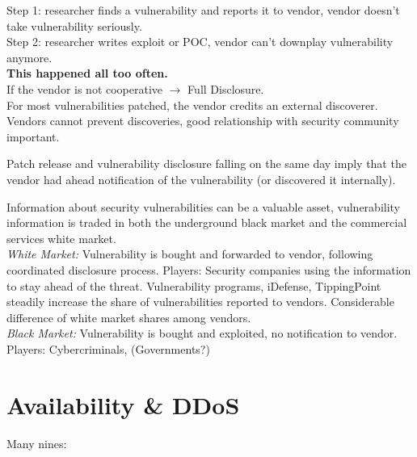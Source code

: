  Step 1: researcher finds a vulnerability and reports it to vendor, vendor doesn't take vulnerability seriously.\\
Step 2: researcher writes exploit or POC, vendor can't downplay vulnerability anymore.\\
\textbf{This happened all too often.}\\
If the vendor is not cooperative $\to$ Full Disclosure. \\
For most vulnerabilities patched, the vendor credits an external discoverer. Vendors cannot prevent discoveries, good relationship with security community important.

 Patch release and vulnerability disclosure falling on the
same day imply that the vendor had ahead notification of the vulnerability (or discovered it internally).

 Information about security vulnerabilities can be a valuable asset, vulnerability information is traded in both the underground black market and the commercial services white market.\\
\emph{White Market:} Vulnerability is bought and forwarded to vendor, following coordinated disclosure process. Players: Security companies using the information to stay ahead of the threat. Vulnerability programs, iDefense, TippingPoint steadily increase the share of vulnerabilities reported to vendors. Considerable difference of white market shares among vendors.\\
\textit{Black Market:} Vulnerability is bought and exploited, no notification to vendor. Players: Cybercriminals, (Governments?)

\section{Availability \& DDoS}


 Many nines:


